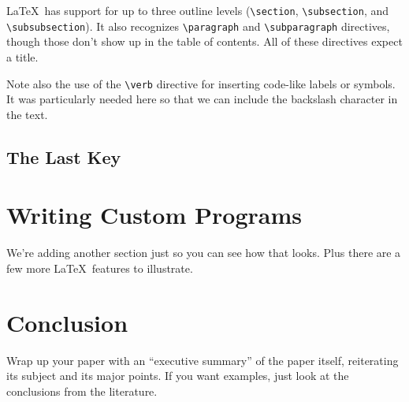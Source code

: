\documentclass{article}
\begin{document}
\LaTeX\ has support for up to three outline levels (\verb!\section!, \verb!\subsection!, and \verb!\subsubsection!).  It also recognizes \verb!\paragraph! and \verb!\subparagraph! directives, though those don't show up in the table of contents.  All of these directives expect a title.

Note also the use of the \verb!\verb! directive for inserting code-like labels or symbols.  It was particularly needed here so that we can include the backslash character in the text.

\subsection{The Last Key}


\section{Writing Custom Programs}

We're adding another section just so you can see how that looks.  Plus there are a few more \LaTeX\ features to illustrate.



\section{Conclusion}

Wrap up your paper with an ``executive summary'' of the paper itself, reiterating its subject and its major points.  If you want examples, just look at the conclusions from the literature.



\end{document}
